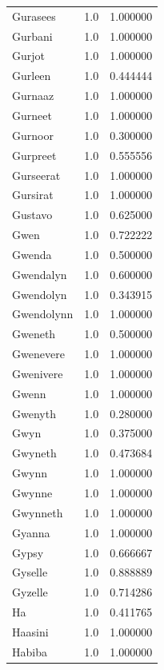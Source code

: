 \documentclass[
  letterpaper,
  DIV=11,
  numbers=noendperiod]{scrreprt}
\begin{document}
\begin{tabular}{lrr}
Gurasees        &   1.0 &   1.000000 \\
Gurbani         &   1.0 &   1.000000 \\
Gurjot          &   1.0 &   1.000000 \\
Gurleen         &   1.0 &   0.444444 \\
Gurnaaz         &   1.0 &   1.000000 \\
Gurneet         &   1.0 &   1.000000 \\
Gurnoor         &   1.0 &   0.300000 \\
Gurpreet        &   1.0 &   0.555556 \\
Gurseerat       &   1.0 &   1.000000 \\
Gursirat        &   1.0 &   1.000000 \\
Gustavo         &   1.0 &   0.625000 \\
Gwen            &   1.0 &   0.722222 \\
Gwenda          &   1.0 &   0.500000 \\
Gwendalyn       &   1.0 &   0.600000 \\
Gwendolyn       &   1.0 &   0.343915 \\
Gwendolynn      &   1.0 &   1.000000 \\
Gweneth         &   1.0 &   0.500000 \\
Gwenevere       &   1.0 &   1.000000 \\
Gwenivere       &   1.0 &   1.000000 \\
Gwenn           &   1.0 &   1.000000 \\
Gwenyth         &   1.0 &   0.280000 \\
Gwyn            &   1.0 &   0.375000 \\
Gwyneth         &   1.0 &   0.473684 \\
Gwynn           &   1.0 &   1.000000 \\
Gwynne          &   1.0 &   1.000000 \\
Gwynneth        &   1.0 &   1.000000 \\
Gyanna          &   1.0 &   1.000000 \\
Gypsy           &   1.0 &   0.666667 \\
Gyselle         &   1.0 &   0.888889 \\
Gyzelle         &   1.0 &   0.714286 \\
Ha              &   1.0 &   0.411765 \\
Haasini         &   1.0 &   1.000000 \\
Habiba          &   1.0 &   1.000000 \\

\end{tabular}
\end{document}
